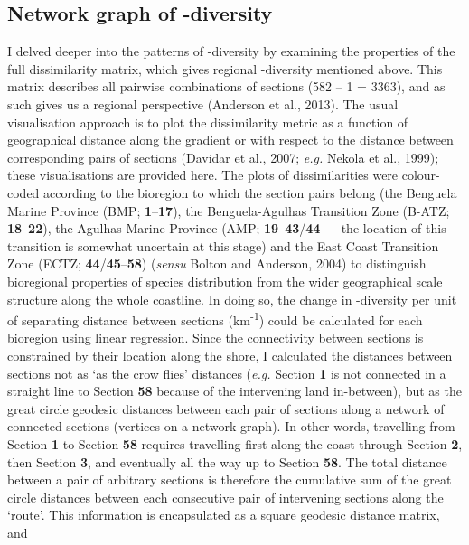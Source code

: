 \documentclass[10pt,A4,]{article}
\begin{document}
\subsection*{Network graph of \textbeta-diversity}

I delved deeper into the patterns of \textbeta-diversity by examining
the properties of the full dissimilarity matrix, which gives regional
\textbeta-diversity mentioned above. This matrix describes all pairwise
combinations of sections (582 -- 1 = 3363), and as such gives us a
regional perspective (Anderson et al., 2013). The usual visualisation
approach is to plot the dissimilarity metric as a function of
geographical distance along the gradient or with respect to the distance
between corresponding pairs of sections (Davidar et al., 2007;
\emph{e.g.} Nekola et al., 1999); these visualisations are provided
here. The plots of dissimilarities were colour-coded according to the
bioregion to which the section pairs belong (the Benguela Marine
Province (BMP; \textbf{1}--\textbf{17}), the Benguela-Agulhas Transition
Zone (B-ATZ; \textbf{18}--\textbf{22}), the Agulhas Marine Province
(AMP; \textbf{19}--\textbf{43}/\textbf{44} --- the location of this
transition is somewhat uncertain at this stage) and the East Coast
Transition Zone (ECTZ; \textbf{44}/\textbf{45}--\textbf{58})
(\emph{sensu} Bolton and Anderson, 2004) to distinguish bioregional
properties of species distribution from the wider geographical scale
structure along the whole coastline. In doing so, the change in
\textbeta-diversity per unit of separating distance between sections
(km\textsuperscript{-1}) could be calculated for each bioregion using
linear regression. Since the connectivity between sections is
constrained by their location along the shore, I calculated the
distances between sections not as `as the crow ﬂies' distances
(\emph{e.g.} Section \textbf{1} is not connected in a straight line to
Section \textbf{58} because of the intervening land in-between), but as
the great circle geodesic distances between each pair of sections along
a network of connected sections (vertices on a network graph). In other
words, travelling from Section \textbf{1} to Section \textbf{58}
requires travelling first along the coast through Section \textbf{2},
then Section \textbf{3}, and eventually all the way up to Section
\textbf{58}. The total distance between a pair of arbitrary sections is
therefore the cumulative sum of the great circle distances between each
consecutive pair of intervening sections along the `route'. This
information is encapsulated as a square geodesic distance matrix, and
\end{document}
